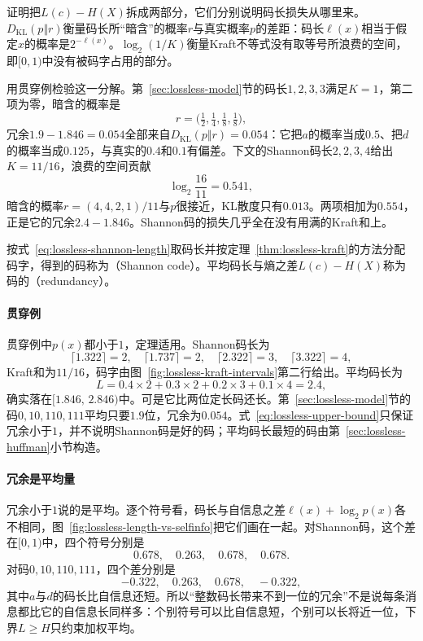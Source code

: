 证明把$L(c)-H(X)$拆成两部分，它们分别说明码长损失从哪里来。$D_{\mathrm{KL}}(p\Vert r)$衡量码长所“暗含”的概率$r$与真实概率$p$的差距：码长$\ell(x)$相当于假定$x$的概率是$2^{-\ell(x)}$。$\log_2(1/K)$衡量Kraft不等式没有取等号所浪费的空间，即$[0,1)$中没有被码字占用的部分。

用贯穿例检验这一分解。第~\ref{sec:lossless-model}节的码长$1,2,3,3$满足$K=1$，第二项为零，暗含的概率是
\[
 r=\bigl(\tfrac12,\tfrac14,\tfrac18,\tfrac18\bigr),
\]
冗余$1.9-1.846=0.054$全部来自$D_{\mathrm{KL}}(p\Vert r)=0.054$：它把$a$的概率当成$0.5$、把$d$的概率当成$0.125$，与真实的$0.4$和$0.1$有偏差。下文的Shannon码长$2,2,3,4$给出$K=11/16$，浪费的空间贡献
\[
 \log_2\frac{16}{11}=0.541,
\]
暗含的概率$r=(4,4,2,1)/11$与$p$很接近，KL散度只有$0.013$。两项相加为$0.554$，正是它的冗余$2.4-1.846$。Shannon码的损失几乎全在没有用满的Kraft和上。

按式~\eqref{eq:lossless-shannon-length}取码长并按定理~\ref{thm:lossless-kraft}的方法分配码字，得到的码称为（Shannon code）。平均码长与熵之差$L(c)-H(X)$称为码的（redundancy）。

\paragraph{贯穿例}
贯穿例中$p(x)$都小于$1$，定理适用。Shannon码长为
\[
 \lceil1.322\rceil=2,\quad\lceil1.737\rceil=2,\quad\lceil2.322\rceil=3,\quad\lceil3.322\rceil=4 ,
\]
Kraft和为$11/16$，码字由图~\ref{fig:lossless-kraft-intervals}第二行给出。平均码长为
\[
 L=0.4\times2+0.3\times2+0.2\times3+0.1\times4=2.4 ,
\]
确实落在$[1.846,\,2.846)$中。可是它比两位定长码还长。第~\ref{sec:lossless-model}节的码$0,10,110,111$平均只要$1.9$位，冗余为$0.054$。式~\eqref{eq:lossless-upper-bound}只保证冗余小于$1$，并不说明Shannon码是好的码；平均码长最短的码由第~\ref{sec:lossless-huffman}小节构造。

\paragraph{冗余是平均量}
冗余小于$1$说的是平均。逐个符号看，码长与自信息之差$\ell(x)+\log_2p(x)$各不相同，图~\ref{fig:lossless-length-vs-selfinfo}把它们画在一起。对Shannon码，这个差在$[0,1)$中，四个符号分别是
\[
 0.678,\quad 0.263,\quad 0.678,\quad 0.678 .
\]
对码$0,10,110,111$，四个差分别是
\[
 -0.322,\quad 0.263,\quad 0.678,\quad -0.322 ,
\]
其中$a$与$d$的码长比自信息还短。所以“整数码长带来不到一位的冗余”不是说每条消息都比它的自信息长同样多：个别符号可以比自信息短，个别可以长将近一位，下界$L\geq H$只约束加权平均。

